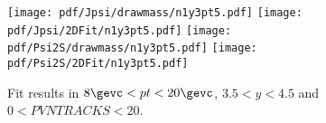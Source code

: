 \begin{figure}[H]
\begin{center}
\texttt{[image: pdf/Jpsi/drawmass/n1y3pt5.pdf]}
\texttt{[image: pdf/Jpsi/2DFit/n1y3pt5.pdf]}
\vspace*{-0.5cm}
\texttt{[image: pdf/Psi2S/drawmass/n1y3pt5.pdf]}
\texttt{[image: pdf/Psi2S/2DFit/n1y3pt5.pdf]}
\vspace*{-0.5cm}
\end{center}
\caption{Fit results in $8\gevc<pt<20\gevc$, $3.5<y<4.5$ and $0<PVNTRACKS<20$.}
\label{Fitn1y3pt5}
\end{figure}
